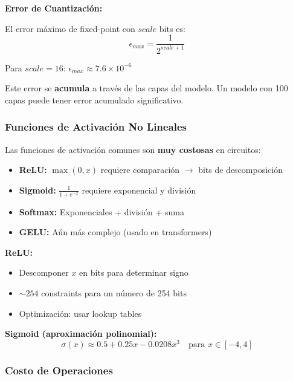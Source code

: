 \documentclass[11pt,a4paper,twoside]{book}
\begin{document}
\begin{mathnote}
\textbf{Error de Cuantizaci\'on:}

El error m\'aximo de fixed-point con $scale$ bits es:
\[
\epsilon_{max} = \frac{1}{2^{scale+1}}
\]

Para $scale = 16$: $\epsilon_{max} \approx 7.6 \times 10^{-6}$

Este error se \textbf{acumula} a trav\'es de las capas del modelo. Un modelo con 100 capas puede tener error acumulado significativo.
\end{mathnote}

\subsubsection{Funciones de Activaci\'on No Lineales}

\begin{remark}
Las funciones de activaci\'on comunes son \textbf{muy costosas} en circuitos:
\begin{itemize}
    \item \textbf{ReLU:} $\max(0, x)$ requiere comparaci\'on $\to$ bits de descomposici\'on
    \item \textbf{Sigmoid:} $\frac{1}{1+e^{-x}}$ requiere exponencial y divisi\'on
    \item \textbf{Softmax:} Exponenciales + divisi\'on + suma
    \item \textbf{GELU:} A\'un m\'as complejo (usado en transformers)
\end{itemize}
\end{remark}

\begin{definition}
\textbf{ReLU:}
\begin{itemize}
    \item Descomponer $x$ en bits para determinar signo
    \item $\sim 254$ constraints para un n\'umero de 254 bits
    \item Optimizaci\'on: usar lookup tables
\end{itemize}

\textbf{Sigmoid (aproximaci\'on polinomial):}
\[
\sigma(x) \approx 0.5 + 0.25x - 0.0208x^3 \quad \text{para } x \in [-4, 4]
\]
\end{definition}

\subsubsection{Costo de Operaciones}
\end{document}
